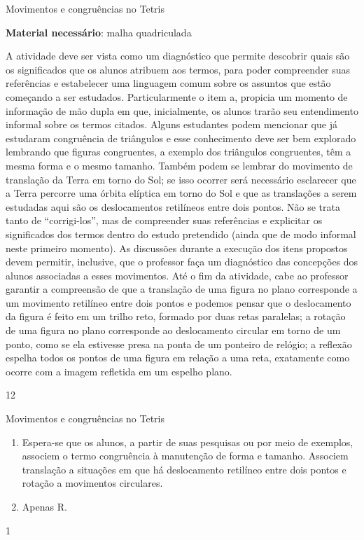 \clearmargin
\begin{sugestions}{Movimentos e congruências no Tetris}
{

\textbf{Material necessário}: malha quadriculada

A atividade deve ser vista como um diagnóstico que permite descobrir quais são os significados que os alunos atribuem aos termos, para poder compreender suas referências e estabelecer uma linguagem comum sobre os assuntos que estão começando a ser estudados. Particularmente o item a, propicia um momento de informação de mão dupla em que, inicialmente, os alunos trarão seu entendimento informal sobre os termos citados. Alguns estudantes podem mencionar que já estudaram congruência de triângulos e esse conhecimento deve ser bem explorado lembrando que figuras congruentes, a exemplo dos triângulos congruentes, têm a mesma forma e o mesmo tamanho. Também podem se lembrar do movimento de translação da Terra em torno do Sol; se isso ocorrer será necessário esclarecer que a Terra percorre uma órbita elíptica em torno do Sol e que as translações a serem estudadas aqui são os deslocamentos retilíneos entre dois pontos.   Não se trata tanto de “corrigi-los”, mas de compreender suas referências e explicitar os significados dos termos dentro do estudo pretendido (ainda que de modo informal neste primeiro momento). As discussões durante a execução dos itens propostos devem permitir, inclusive, que o professor faça um diagnóstico das concepções dos alunos associadas a esses movimentos. Até o fim da atividade, cabe ao professor garantir a compreensão de que a translação de uma figura no plano corresponde a um movimento retilíneo entre dois pontos e podemos pensar que o deslocamento da figura é feito em um trilho reto, formado por duas retas paralelas; a rotação de uma figura no plano corresponde ao deslocamento circular em torno de um ponto, como se ela estivesse presa na ponta de um ponteiro de relógio; a reflexão espelha todos os pontos de uma figura em relação a uma reta, exatamente como ocorre com a imagem refletida em um espelho plano. 
}{1}{2}
\end{sugestions}
\begin{answer}{Movimentos e congruências no Tetris}
{
\begin{enumerate}
\item Espera-se que os alunos, a partir de suas pesquisas ou por meio de exemplos, associem o termo congruência à manutenção de forma e tamanho. Associem translação a situações em que há deslocamento retilíneo entre dois pontos e rotação a movimentos circulares. 
\item Apenas R.

\end{enumerate}
}{1}
\end{answer}
